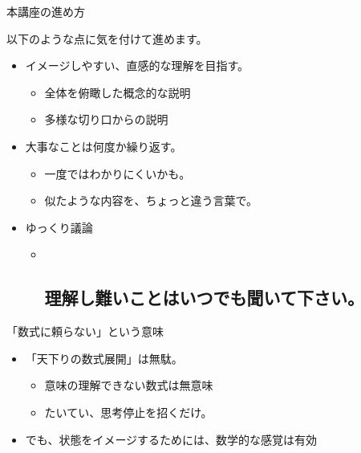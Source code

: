 \begin{frame}

\begin{block}{本講座の進め方}

以下のような点に気を付けて進めます。

\begin{itemize}

\item
  イメージしやすい、直感的な理解を目指す。

  \begin{itemize}
  
  \item
    全体を俯瞰した概念的な説明
  \item
    多様な切り口からの説明\\
  \end{itemize}
\item
  大事なことは何度か繰り返す。

  \begin{itemize}
  
  \item
    一度ではわかりにくいかも。
  \item
    似たような内容を、ちょっと違う言葉で。
  \end{itemize}
\item
  ゆっくり議論

  \begin{itemize}
  \item ~
    \subsection{\texorpdfstring{{理解し難いことはいつでも聞いて下さい。}}{理解し難いことはいつでも聞いて下さい。}}
  \end{itemize}
\end{itemize}

\end{block}

\begin{block}{「数式に頼らない」という意味}

\begin{itemize}

\item
  「天下りの数式展開」は無駄。

  \begin{itemize}
  
  \item
    意味の理解できない数式は無意味
  \item
    たいてい、思考停止を招くだけ。
  \end{itemize}
\item
  でも、状態をイメージするためには、数学的な感覚は有効


\end{itemize}
\end{block}
\end{frame}
